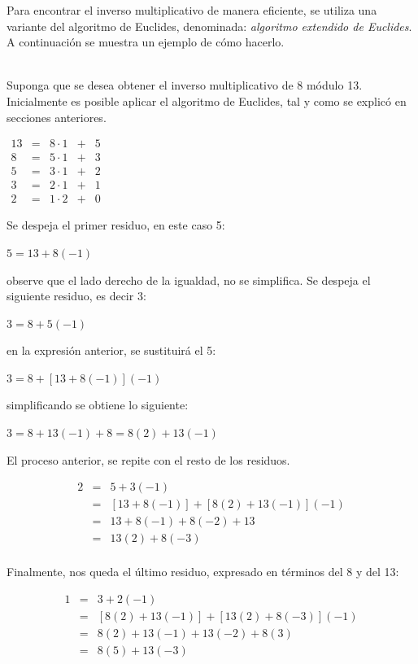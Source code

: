  Para encontrar el inverso multiplicativo de manera eficiente, se utiliza
una variante del algoritmo de Euclides, denominada: {\it algoritmo extendido
de Euclides}. A continuaci\'on se muestra un ejemplo de c\'omo hacerlo.
 \\ \\
\begin{example}
Suponga que se desea obtener el inverso multiplicativo de 8 m\'odulo 13.
Inicialmente es posible aplicar el algoritmo de Euclides, tal y como 
se explic\'o en secciones anteriores. 
\begin{center}
$\begin{array}{cclcl}
  13 &=&8 \cdot 1 & + &5 \\
   8&=&5 \cdot 1 & + &3 \\
   5&=&3 \cdot 1 & + &2 \\
   3&=&2\cdot 1 & + &1 \\
   2&=&1\cdot 2 & + &0 
 \end{array}$
\end{center}
Se despeja el primer residuo, en este caso 5:
\begin{center}
$5=13+8(-1)$
\end{center}
observe que el lado derecho de la igualdad, no se simplifica. Se despeja 
el siguiente residuo, es decir 3:
\begin{center}
$3=8+5(-1)$
\end{center}
en la expresi\'on anterior, se sustituir\'a el 5:
\begin{center}
$3=8+[13+8(-1)](-1)$
\end{center} 
simplificando se obtiene lo siguiente:
\begin{center}
$3=8+13(-1)+8=8(2)+13(-1)$
\end{center}
El proceso anterior, se repite con el resto de los residuos. 
\begin{center}
\begin{eqnarray*}
2&=&5+3(-1) \\
 &=&\left[13+8(-1) \right] + \left[ 8(2)+13(-1) \right] (-1) \\
 &=& 13 + 8(-1) + 8(-2)+13 \\
 &=& 13(2)+8(-3) \\
\end{eqnarray*}
\end{center}
Finalmente, nos queda el \'ultimo residuo, expresado en t\'erminos del
8 y del 13:
\begin{center}
\begin{eqnarray*}
  1&=&3+2(-1) \\
   &=&[8(2)+13(-1)] + [13(2)+8(-3)](-1) \\
   &=& 8(2) + 13(-1) + 13(-2) + 8(3) \\
   &=& 8(5)+13(-3) \\
 \end{eqnarray*}
\end{center}
\end{example}

